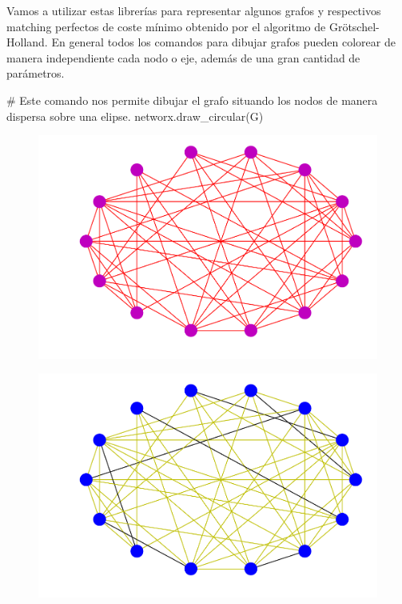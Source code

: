 \documentclass[twoside,a4paper,openright,12pt]{book}
\begin{document}
Vamos a utilizar estas librerías para representar algunos grafos y respectivos matching perfectos de coste mínimo obtenido por el algoritmo de Grötschel-Holland. En general todos los comandos para dibujar grafos pueden colorear de manera independiente cada nodo o eje, además de una gran cantidad de parámetros. 
\begin{pythone}
# Este comando nos permite dibujar el grafo situando los nodos de manera dispersa sobre una elipse.
networx.draw_circular(G)
\end{pythone}



\begin{figure}[h!]
\centering
\includegraphics[scale=0.45]{foo}
\caption{}
\end{figure}

\begin{figure}[h!]
\centering
\includegraphics[scale=0.45]{foo1}
\caption{}
\end{figure}
\end{document}
